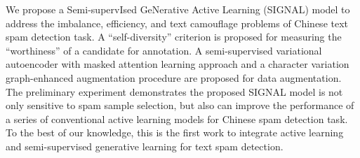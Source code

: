 We propose a Semi-supervIsed GeNerative Active Learning (SIGNAL) model to address the imbalance, efficiency, and text camouflage problems of Chinese text spam detection task. A ``self-diversity'' criterion is proposed for measuring the ``worthiness'' of a candidate for annotation. A semi-supervised variational autoencoder with masked attention learning approach and a character variation graph-enhanced augmentation procedure are proposed for data augmentation. The preliminary experiment demonstrates the proposed SIGNAL model is not only sensitive to spam sample selection, but also can improve the performance of a series of conventional active learning models for Chinese spam detection task. To the best of our knowledge, this is the first work to integrate active learning and semi-supervised generative learning for text spam detection.
